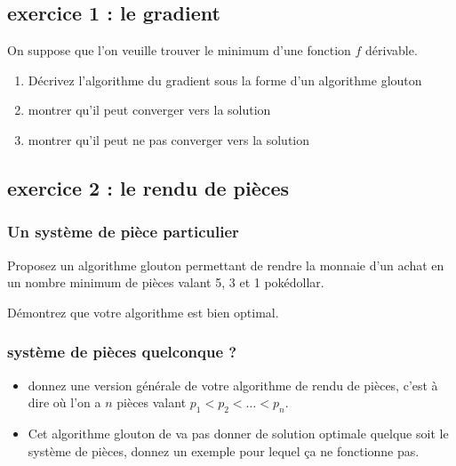 \documentclass[
]{article}
\providecommand{\tightlist}{%
  \setlength{\itemsep}{0pt}\setlength{\parskip}{0pt}}
\begin{document}
\hypertarget{exercice-1-le-gradient}{%
\subsection{exercice 1 : le gradient}\label{exercice-1-le-gradient}}

On suppose que l'on veuille trouver le minimum d'une fonction \(f\)
dérivable.

\begin{enumerate}
\def\labelenumi{\arabic{enumi}.}
\tightlist
\item
  Décrivez l'algorithme du gradient sous la forme d'un algorithme
  glouton
\item
  montrer qu'il peut converger vers la solution
\item
  montrer qu'il peut ne pas converger vers la solution
\end{enumerate}

\hypertarget{exercice-2-le-rendu-de-piuxe8ces}{%
\subsection{exercice 2 : le rendu de
pièces}\label{exercice-2-le-rendu-de-piuxe8ces}}

\hypertarget{un-systuxe8me-de-piuxe8ce-particulier}{%
\subsubsection{Un système de pièce
particulier}\label{un-systuxe8me-de-piuxe8ce-particulier}}

Proposez un algorithme glouton permettant de rendre la monnaie d'un
achat en un nombre minimum de pièces valant 5, 3 et 1 pokédollar.

Démontrez que votre algorithme est bien optimal.

\hypertarget{systuxe8me-de-piuxe8ces-quelconque}{%
\subsubsection{système de pièces quelconque
?}\label{systuxe8me-de-piuxe8ces-quelconque}}

\begin{itemize}
\tightlist
\item
  donnez une version générale de votre algorithme de rendu de pièces,
  c'est à dire où l'on a \(n\) pièces valant
  \(p_1 < p_2 < \dots < p_n\).
\item
  Cet algorithme glouton de va pas donner de solution optimale quelque
  soit le système de pièces, donnez un exemple pour lequel ça ne
  fonctionne pas.
\end{itemize}
\end{document}
